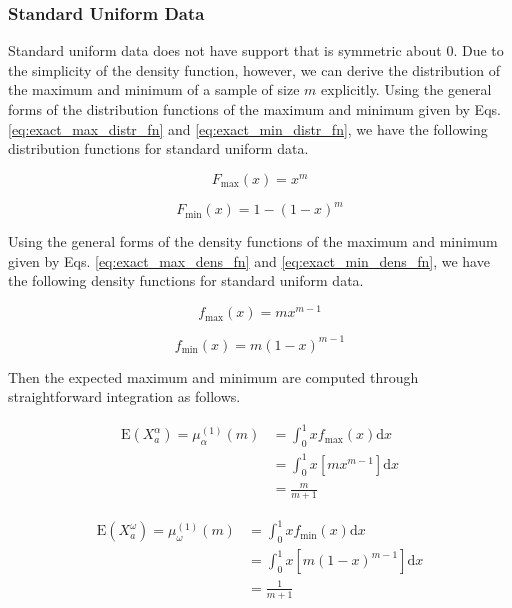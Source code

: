 \documentclass[10pt,letterpaper]{article}\usepackage[]{graphicx}\usepackage[]{color}
\begin{document}
\subsubsection{Standard Uniform Data}

Standard uniform data does not have support that is symmetric about 0. Due to the simplicity of the density function, however, we can derive the distribution of the maximum and minimum of a sample of size $m$ explicitly. Using the general forms of the distribution functions of the maximum and minimum given by Eqs. \ref{eq:exact_max_distr_fn} and \ref{eq:exact_min_distr_fn}, we have the following distribution functions for standard uniform data.

\begin{equation}\label{eq:uniform_max_distr}
F_\text{max}(x) = x^m
\end{equation}

\begin{equation}\label{eq:uniform_min_distr}
F_\text{min}(x) = 1 - (1 - x)^m
\end{equation}

Using the general forms of the density functions of the maximum and minimum given by Eqs. \ref{eq:exact_max_dens_fn} and \ref{eq:exact_min_dens_fn}, we have the following density functions for standard uniform data.

\begin{equation}\label{eq:uniform_max_dens}
f_\text{max}(x) = m x^{m-1}
\end{equation}

\begin{equation}\label{eq:uniform_min_dens}
f_\text{min}(x) = m(1 - x)^{m-1}
\end{equation}

Then the expected maximum and minimum are computed through straightforward integration as follows.

\begin{equation}\label{eq:mu_max_uniform}
\begin{aligned}
\text{E}(X^\alpha_a) = \mu^{(1)}_\alpha(m) &= \int_{0}^{1} x f_\text{max}(x) \text{d}x \\
&= \int_{0}^{1} x [m x^{m-1}] \text{d}x \\
&= \frac{m}{m+1}
\end{aligned}
\end{equation}

\begin{equation}\label{eq:mu_min_uniform}
\begin{aligned}
\text{E}(X^\omega_a) = \mu^{(1)}_\omega(m) &= \int_{0}^{1} x f_\text{min}(x) \text{d}x \\
&= \int_{0}^{1} x [m (1 - x)^{m-1}] \text{d}x \\
&= \frac{1}{m+1}
\end{aligned}
\end{equation}
\end{document}
